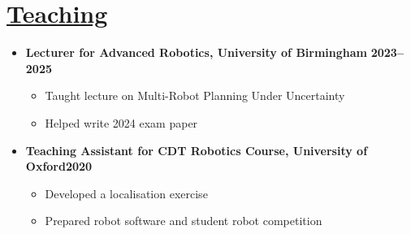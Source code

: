 \documentclass[11pt]{article}
\begin{document}
\section*{\underline{Teaching}}
\begin{itemize}
\item \textbf{Lecturer for Advanced Robotics, University of Birmingham} \hfill  \textbf{2023--2025}
\begin{itemize}
\item Taught lecture on Multi-Robot Planning Under Uncertainty
\item Helped write 2024 exam paper
\end{itemize}
\item \textbf{Teaching Assistant for CDT Robotics Course, University of Oxford}\hfill \textbf{2020}
\begin{itemize}
\item Developed a localisation exercise
\item Prepared robot software and student robot competition
\end{itemize}
\end{itemize}

\iffalse
\end{document}
